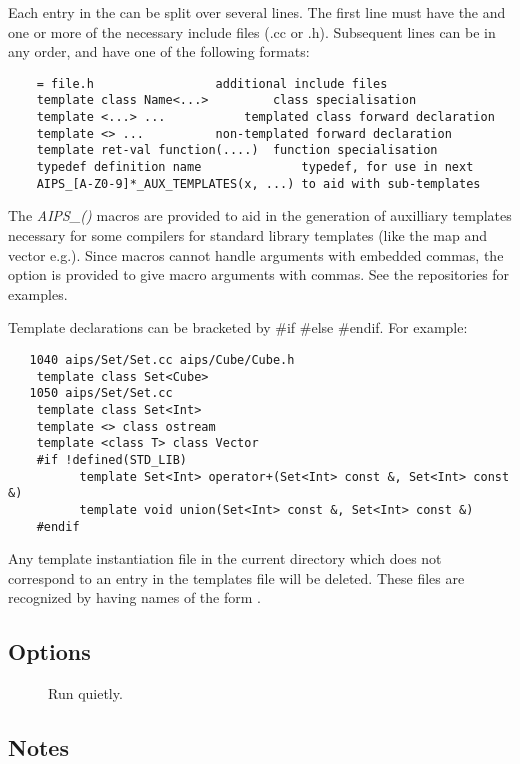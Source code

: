 \noindent
Each entry in the  can be split over several lines. The first
line must have the  and one or more of the necessary include
files (.cc or .h). Subsequent lines can be in any order, and have one of the
following formats:
\begin{verbatim}
    = file.h				 additional include files
    template class Name<...>		 class specialisation
    template <...> ...			 templated class forward declaration
    template <> ...			 non-templated forward declaration
    template ret-val function(....)	 function specialisation
    typedef definition name              typedef, for use in next
    AIPS_[A-Z0-9]*_AUX_TEMPLATES(x, ...) to aid with sub-templates
\end{verbatim}

\noindent
The {\em AIPS\_()} macros are provided to aid in the generation of
auxilliary templates necessary for some compilers for standard
library templates (like the map and vector e.g.). Since macros
cannot handle arguments with embedded commas, the 
option is provided to give macro arguments with commas. See the
repositories for examples.

\noindent
Template declarations can be bracketed by \#if
\#else \#endif. For example:

\begin{verbatim}
   1040 aips/Set/Set.cc aips/Cube/Cube.h
	template class Set<Cube>
   1050 aips/Set/Set.cc 
	template class Set<Int>
	template <> class ostream
	template <class T> class Vector
	#if !defined(STD_LIB)
    	  template Set<Int> operator+(Set<Int> const &, Set<Int> const &)
      	  template void union(Set<Int> const &, Set<Int> const &)
	#endif
\end{verbatim}

\noindent
Any template instantiation  file in the current directory which does
not correspond to an entry in the templates file will be deleted.  These files
are recognized by having names of the form .

\subsection*{Options}
 
\begin{description}
\item[]
   Run quietly.
\end{description}
 
\subsection*{Notes}
 
